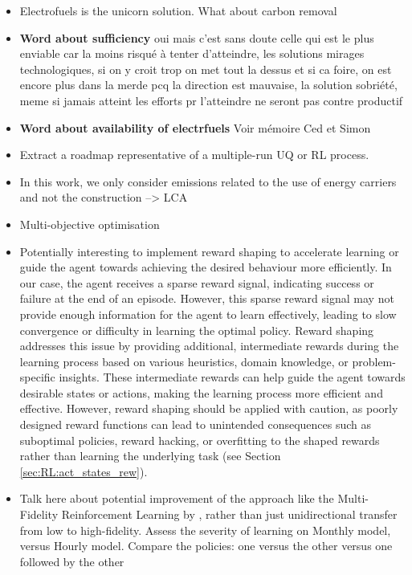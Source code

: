 \begin{itemize}
\item Electrofuels is the unicorn solution. What about carbon removal
\item \textbf{Word about sufficiency} oui mais c'est sans doute celle qui est le plus enviable car la moins risqué à tenter d'atteindre, les solutions mirages technologiques, si on y croit trop on met tout la dessus et si ca foire, on est encore plus dans la merde pcq la direction est mauvaise, la solution sobriété, meme si jamais atteint les efforts pr l'atteindre ne seront pas contre productif
\item \textbf{Word about availability of electrfuels} Voir mémoire Ced et Simon
\item Extract a roadmap representative of a multiple-run UQ or RL process.
\item In this work, we only consider emissions related to the use of energy carriers and not the construction --> LCA
\item Multi-objective optimisation
\item Potentially interesting to implement reward shaping to accelerate learning or guide the agent towards achieving the desired behaviour more efficiently. In our case, the agent receives a sparse reward signal, indicating success or failure at the end of an episode. However, this sparse reward signal may not provide enough information for the agent to learn effectively, leading to slow convergence or difficulty in learning the optimal policy. Reward shaping addresses this issue by providing additional, intermediate rewards during the learning process based on various heuristics, domain knowledge, or problem-specific insights. These intermediate rewards can help guide the agent towards desirable states or actions, making the learning process more efficient and effective. However, reward shaping should be applied with caution, as poorly designed reward functions can lead to unintended consequences such as suboptimal policies, reward hacking, or overfitting to the shaped rewards rather than learning the underlying task (see Section \ref{sec:RL:act_states_rew}).

\item Talk here about potential improvement of the approach like the Multi-Fidelity Reinforcement Learning by \citet{cutler2014reinforcement}, rather than just unidirectional transfer from low to high-fidelity. Assess the severity of learning on Monthly model, versus Hourly model. Compare the policies: one versus the other versus one followed by the other
\end{itemize}


